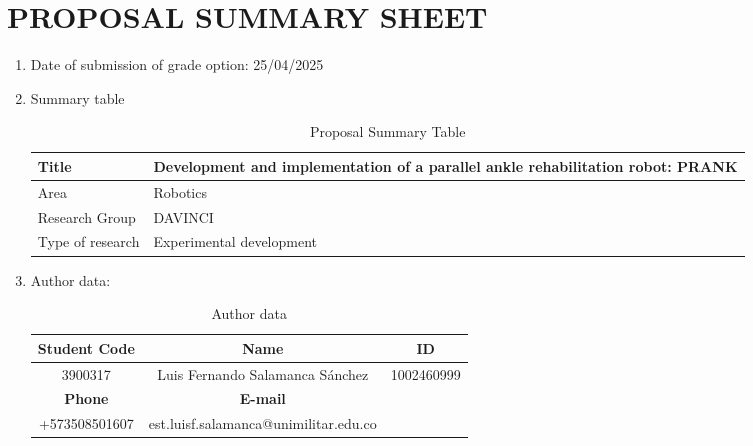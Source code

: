 \section*{PROPOSAL SUMMARY SHEET}
{}

\begin{enumerate}
    \item Date of submission of grade option: 25/04/2025
    \item Summary table
    \begin{table}[h]
        \centering
        \begin{tabular}{|s|m{0.8\textwidth}|}
        \hline
          Title   &  Development and implementation of a parallel ankle rehabilitation robot: PRANK \\
        \hline
          Area   & Robotics  
          \\
        \hline
          Research Group & DAVINCI  
          \\
        \hline
          Type of research & Experimental development
          \\
        \hline
        \end{tabular}
        \caption{Proposal Summary Table}
        \label{tab:summary}
    \end{table}
    \item Author data:
    \begin{table}[h]
        \centering
        \begin{tabular}{|c|c|c|}
        \hline
        \rowcolor{Gray}
            \textbf{Student Code} & \textbf{Name} & \textbf{ID}\\
        \hline
            3900317 & Luis Fernando Salamanca Sánchez & 1002460999\\
        \hline
        \rowcolor{Gray}
            \textbf{Phone} & \textbf{E-mail}  \\
        \cline{1-2}
            +573508501607 & est.luisf.salamanca@unimilitar.edu.co\\
        \cline{1-2}
        \end{tabular}     
        \caption{Author data}
        \label{tab:author_data}
    \end{table}
\end{enumerate}
